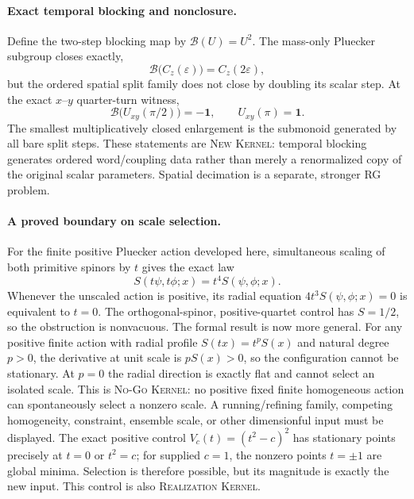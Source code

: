 \documentclass[11pt]{article}
\newcommand{\Kernel}{\textcolor{kernelcolor}{\textsc{Kernel}}}
\newcommand{\NewResult}{\textsc{New}}
\newcommand{\Realization}{\textsc{Realization}}
\newcommand{\NoGo}{\textsc{No-Go}}
\newcommand{\id}{\mathbf{1}}
\begin{document}
\paragraph{Exact temporal blocking and nonclosure.}
Define the two-step blocking map by $\mathcal B(U)=U^2$.  The mass-only
Pluecker subgroup closes exactly,
\[
 \mathcal B\bigl(C_z(\varepsilon)\bigr)=C_z(2\varepsilon),
\]
but the ordered spatial split family does not close by doubling its scalar
step.  At the exact $x$--$y$ quarter-turn witness,
\begin{equation}\label{eq:rgcounterexample}
 \mathcal B\bigl(U_{xy}(\pi/2)\bigr)=-\id,
 \qquad U_{xy}(\pi)=\id.
\end{equation}
The smallest multiplicatively closed enlargement is the submonoid generated
by all bare split steps.  These statements are \NewResult{} \Kernel{}: temporal
blocking generates ordered word/coupling data rather than merely a
renormalized copy of the original scalar parameters.  Spatial decimation is a
separate, stronger RG problem.

\paragraph{A proved boundary on scale selection.}
For the finite positive Pluecker action developed here, simultaneous scaling
of both primitive spinors by $t$ gives the exact law
\begin{equation}\label{eq:quarticscalenogo}
 S(t\psi,t\phi;x)=t^4S(\psi,\phi;x).
\end{equation}
Whenever the unscaled action is positive, its radial equation
$4t^3S(\psi,\phi;x)=0$ is equivalent to $t=0$.  The orthogonal-spinor,
positive-quartet control has $S=1/2$, so the obstruction is nonvacuous.
The formal result is now more general.  For any positive finite action with
radial profile $S(tx)=t^pS(x)$ and natural degree $p>0$, the derivative at unit
scale is $pS(x)>0$, so the configuration cannot be stationary.  At $p=0$ the
radial direction is exactly flat and cannot select an isolated scale.  This is
\NoGo{} \Kernel{}: no positive fixed finite homogeneous action can
spontaneously select a nonzero scale.  A running/refining family, competing
homogeneity, constraint, ensemble scale, or other dimensionful input must be
displayed.
The exact positive control $V_c(t)=(t^2-c)^2$ has stationary points precisely
at $t=0$ or $t^2=c$; for supplied $c=1$, the nonzero points $t=\pm1$ are global
minima.  Selection is therefore possible, but its magnitude is exactly the
new input.  This control is also \Realization{} \Kernel{}.
\end{document}
